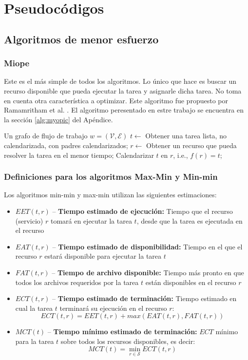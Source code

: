 \chapter{Pseudocódigos}

\section{Algoritmos de menor esfuerzo}
\subsection{Miope}
Este es el más simple de todos los algoritmos. Lo único que hace es buscar un recurso disponible que pueda ejecutar la tarea y asignarle dicha tarea. No toma en cuenta otra característica a optimizar. Este algoritmo fue propuesto por Ramamritham et al. \cite{ramamritham1990efficient}. El algoritmo \cite{yu2008workflow} peresentado en estre trabajo se encuentra en la sección \ref{alg:myopic} del Apéndice.

\label{alg:myopic}
\begin{algorithmic}[1]
\Require Un grafo de flujo de trabajo $w=(\mathcal{V}, \mathcal{E})$
	\State $t \gets$ Obtener una tarea lista, no calendarizada, con padres calendarizados;
	\State $r \gets$ Obtener un recurso que pueda resolver la tarea en el menor tiempo;
	\State Calendarizar $t$ en $r$, i.e., $f(r) = t$;
\EndWhile
\end{algorithmic}

\subsection{Definiciones para los algoritmos Max-Min y Min-min}
Los algoritmos min-min y max-min utilizan las siguientes  estimaciones: %
\begin{itemize}
\item{$EET(t,r)$ -- \textbf{Tiempo estimado de ejecución:} Tiempo que el recurso (servicio) $r$ tomará en ejecutar la tarea $t$, desde que la tarea es ejecutada en el recurso}
\item{$EAT(t,r)$ -- \textbf{Tiempo estimado de disponibilidad:} Tiempo en el que el recurso $r$ estará disponible para ejecutar la tarea $t$}
\item{$FAT(t,r)$ -- \textbf{Tiempo de archivo disponible:} Tiempo más pronto en que todos los archivos requeridos por la tarea $t$ están disponibles en el recurso $r$}
\item{$ECT(t,r)$ -- \textbf{Tiempo estimado de terminación:} Tiempo estimado en cual la tarea $t$ terminará su ejecución en el recurso $r$: 
              \[ ECT(t,r) = EET(t,r) + max(EAT(t,r), FAT(t,r)) \]}
\item{$MCT(t)$ -- \textbf{Tiempo mínimo estimado de terminación: } $ECT$ mínimo para la tarea $t$ sobre todos los recursos disponibles, es decir: 
            \[ MCT(t) = \min_{r \in \mathcal{S}} ECT(t,r) \]}
\end{itemize}

